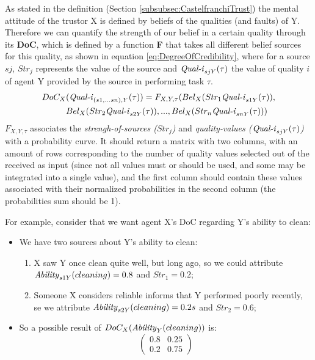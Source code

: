 As stated in the definition (Section \ref{subsubsec:CastelfranchiTrust}) the mental attitude of the trustor X is defined by beliefs of the qualities (and faults) of Y. Therefore we can quantify the strength of our belief in a certain quality through its \textbf{\ac{DoC}}, which is defined by a function \textbf{F} that takes all different belief sources for this quality, as shown in equation \ref{eq:DegreeOfCredibility}, where for a source $sj$, $Str_j$ represents the value of the source and $\text{\textit{Qual-i}}_{sjY}(\tau)$ the value of quality $i$ of agent Y provided by the source in performing task $\tau$. 
\begin{equation}
\begin {aligned}
DoC_X&(\text{\textit{Qual-i}}_{(s1, ...sn), Y} (\tau)) = F_{X, Y, \tau} (Bel_X(Str_1 \text{\textit{Qual-i}}_{s1Y}(\tau)), \\
&Bel_X(Str_2 \text{\textit{Qual-i}}_{s2Y}(\tau)), ..., Bel_X(Str_n \text{\textit{Qual-i}}_{snY}(\tau))) \\
\end {aligned}
\label{eq:DegreeOfCredibility}
\end{equation}
$F_{X, Y, \tau}$ associates the \textit{strengh-of-sources ($Str_j$)} and \textit{quality-values ($\text{\textit{Qual-i}}_{sjY}(\tau)$)} with a probability curve. It should return a matrix with two columns, with an amount of rows corresponding to the number of quality values selected out of the received as input (since not all values must or should be used, and some may be integrated into a single value), and the first column should contain these values associated with their normalized probabilities in the second column (the probabilities sum should be 1). 

For example, consider that we want agent X's \ac{DoC} regarding Y's ability to clean:
\begin{itemize}
    \item We have two sources about Y's ability to clean:
    \begin{enumerate}
        \item X saw Y once clean quite well, but long ago, so we could attribute $\text{\textit{Ability}}_{s1Y}(cleaning) = 0.8$ and $Str_1=0.2$;
        \item Someone X considers reliable informs that Y performed poorly recently, se we attribute
        $\text{\textit{Ability}}_{s2Y}(cleaning) = 0.2s$ and $Str_2=0.6$;
    \end{enumerate}
    \item So a possible result of $DoC_X(\text{\textit{Ability}}_Y (cleaning))$ is:
    $$\begin{pmatrix}
    0.8 & 0.25 \\
    0.2 & 0.75
    \end{pmatrix}$$
\end{itemize} 


